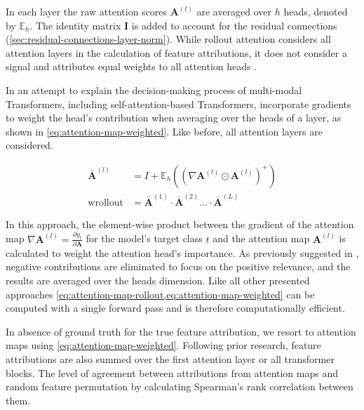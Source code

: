 In each layer the raw attention scores $\mathbf{A}^{(l)}$ are averaged over $h$ heads, denoted by $\mathbb{E}_h$. The identity matrix $\mathbf{I}$ is added to account for the residual connections (\cref{sec:residual-connections-layer-norm}). While rollout attention considers all attention layers in the calculation of feature attributions, it does not consider a signal and attributes equal weights to all attention heads \autocite[][786]{cheferTransformerInterpretabilityAttention2021}.

In an attempt to explain the decision-making process of multi-modal Transformers, including self-attention-based Transformers, \textcite[][3]{cheferTransformerInterpretabilityAttention2021} incorporate gradients to weight the head's contribution when averaging over the heads of a layer, as shown in \cref{eq:attention-map-weighted}. Like before, all attention layers are considered.

\begin{equation}
    \begin{aligned}
        \bar{\mathbf{A}}^{(l)}   & =I+ \mathbb{E}_h\left(\left(\nabla \mathbf{A}^{(l)} \odot \mathbf{A}^{(l)}\right)^{+}\right) \\
        \operatorname {wrollout} & =\bar{\mathbf{A}}^{(1)} \cdot \bar{\mathbf{A}}^{(2)} \ldots \cdot \bar{\mathbf{A}}^{(L)}
    \end{aligned}
    \label{eq:attention-map-weighted}
\end{equation}

In this approach, the element-wise product between the gradient of the attention map $\nabla \mathbf{A}^{(l)}=\frac{\partial y_t}{\partial \mathbf{A}}$ for the model's target class $t$ and the attention map $\mathbf{A}^{(l)}$ is calculated to weight the attention head's importance. As previously suggested in \textcite[][786]{cheferTransformerInterpretabilityAttention2021}, negative contributions are eliminated to focus on the positive relevance, and the results are averaged over the heads dimension. Like all other presented approaches \cref{eq:attention-map-rollout,eq:attention-map-weighted} can be computed with a single forward pass and is therefore computationally efficient.

In absence of ground truth for the true feature attribution, we resort to attention maps using \cref{eq:attention-map-weighted}. Following prior research, feature attributions are also summed over the first attention layer or all transformer blocks. The level of agreement between attributions from attention maps and random feature permutation by calculating Spearman's rank correlation between them.


